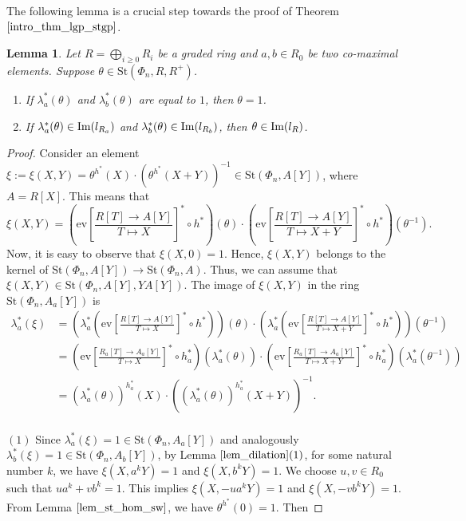 \documentclass[11pt]{amsart}
\newtheorem{lem}[thm]{Lemma}
\theoremstyle{definition}
\numberwithin{equation}{section}
\numberwithin{equation}{section}
\newcommand{\Img}{{\rm Im}}
\newcommand{\<}{\langle}
\renewcommand{\>}{\rangle}
\newcommand{\St}{\mathrm{St}}
\newcommand{\ev}{\mathrm{ev}}
\begin{document}
The following lemma
is a crucial step towards the proof of Theorem $\ref{intro_thm_lgp_stgp}$.
\begin{lem}
    Let $R=\bigoplus_{i\geq 0}R_{i}$ be a graded ring and $a,b\in R_{0}$ be two co-maximal elements. Suppose $\theta\in \St(\Phi_{n},R, R^{+})$. 
     \begin{enumerate}
        \item If $\lambda^{\ast}_{a}(\theta)$ and $\lambda^{\ast}_{b}(\theta)$ are equal to $1$, then $\theta=1$.
        \item If $\lambda^{\ast}_{a}(\theta)\in\Img(l_{R_{a}})$ and $\lambda^{\ast}_{b}(\theta)\in\Img(l_{R_{b}})$, then $\theta\in\Img(l_{R})$. 
    \end{enumerate}\label{lem_comax}
\end{lem}
\begin{proof}
     Consider an element $\xi:=\xi(X,Y)=\theta^{h^{\ast}}(X)\cdot(\theta^{h^{\ast}}(X+Y))^{-1}\in\St(\Phi_n,A[Y])$, where $A=R[X]$. This means that \[\xi(X,Y)=\left(\ev\left [\frac{R[T]\to A[Y]}{T\mapsto X}\right ]^{\ast}\circ h^{\ast}\right)(\theta)\cdot\left(\ev\left [\frac{R[T]\to A[Y]}{T\mapsto X+Y}\right ]^{\ast}\circ h^{\ast}\right)(\theta^{-1}).\] Now, it is easy to observe that $\xi(X,0)=1$. Hence, $\xi(X,Y)$ belongs to the kernel of $\St(\Phi_{n},A[Y])\to\St(\Phi_{n},A)$. Thus, we can assume that $\xi(X,Y)\in\St(\Phi_{n},A[Y], YA[Y])$. The image of $\xi(X,Y)$ in the ring $\St(\Phi_n,A_{a}[Y])$ is \[\begin{split}
         \lambda^{\ast}_{a}(\xi)&=\left(\lambda^{\ast}_{a}\left(\ev\left [\frac{R[T]\to A[Y]}{T\mapsto X}\right ]^{\ast}\circ h^{\ast}\right)\right)(\theta)\cdot\left(\lambda^{\ast}_{a}\left(\ev\left [\frac{R[T]\to A[Y]}{T\mapsto X+Y}\right ]^{\ast}\circ h^{\ast}\right)\right)(\theta^{-1})\\
         &=\left(\ev\left [\frac{R_{a}[T]\to A_{a}[Y]}{T\mapsto X}\right ]^{\ast}\circ h_{a}^{\ast}\right)( \lambda^{\ast}_{a}(\theta))\cdot\left(\ev\left [\frac{R_{a}[T]\to A_{a}[Y]}{T\mapsto X+Y}\right ]^{\ast}\circ h_{a}^{\ast}\right)( \lambda^{\ast}_{a}(\theta^{-1}))\\
         &=(\lambda^{\ast}_{a}(\theta))^{h_{a}^{\ast}}(X)\cdot((\lambda^{\ast}_{a}(\theta))^{h_{a}^{\ast}}(X+Y))^{-1}.
     \end{split}\] \\
     $(1)$ Since $\lambda^{\ast}_{a}(\xi)=1\in\St(\Phi_n,A_{a}[Y])$ and analogously $\lambda^{\ast}_{b}(\xi)=1\in\St(\Phi_{n},A_{b}[Y])$, by Lemma $\ref{lem_dilation}(1)$, for some natural number $k$, we have $\xi(X,a^{k}Y)=1$ and $\xi(X,b^{k}Y)=1$. We choose $u,v\in R_{0}$ such that $ua^{k}+vb^{k}=1$. This implies $\xi(X,-ua^{k}Y)=1$ and $\xi(X,-vb^{k}Y)=1$. From Lemma $\ref{lem_st_hom_sw}$, we have $\theta^{h^{\ast}}(0)=1$. Then

\end{proof}
\end{document}
